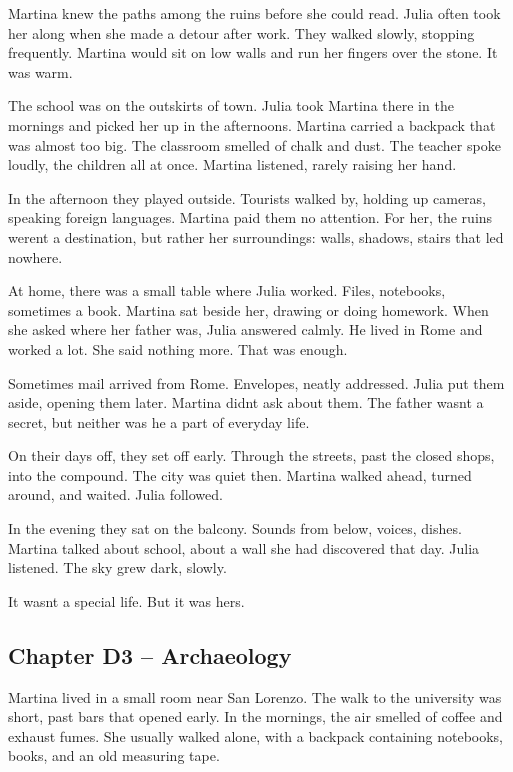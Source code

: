 \documentclass[
]{article}
\begin{document}
Martina knew the paths among the ruins before she could read. Julia often took her along when she made a detour after work. They walked slowly, stopping frequently. Martina would sit on low walls and run her fingers over the stone. It was warm.

The school was on the outskirts of town. Julia took Martina there in the mornings and picked her up in the afternoons. Martina carried a backpack that was almost too big. The classroom smelled of chalk and dust. The teacher spoke loudly, the children all at once. Martina listened, rarely raising her hand.

In the afternoon they played outside. Tourists walked by, holding up cameras, speaking foreign languages. Martina paid them no attention. For her, the ruins weren\textquotesingle t a destination, but rather her surroundings: walls, shadows, stairs that led nowhere.

At home, there was a small table where Julia worked. Files, notebooks, sometimes a book. Martina sat beside her, drawing or doing homework. When she asked where her father was, Julia answered calmly. He lived in Rome and worked a lot. She said nothing more. That was enough.

Sometimes mail arrived from Rome. Envelopes, neatly addressed. Julia put them aside, opening them later. Martina didn\textquotesingle t ask about them. The father wasn\textquotesingle t a secret, but neither was he a part of everyday life.

On their days off, they set off early. Through the streets, past the closed shops, into the compound. The city was quiet then. Martina walked ahead, turned around, and waited. Julia followed.

In the evening they sat on the balcony. Sounds from below, voices, dishes. Martina talked about school, about a wall she had discovered that day. Julia listened. The sky grew dark, slowly.

It wasn\textquotesingle t a special life. But it was hers.

\subsection{Chapter D3 -- Archaeology}\label{chapter-d3-archaeology}

Martina lived in a small room near San Lorenzo. The walk to the university was short, past bars that opened early. In the mornings, the air smelled of coffee and exhaust fumes. She usually walked alone, with a backpack containing notebooks, books, and an old measuring tape.
\end{document}
